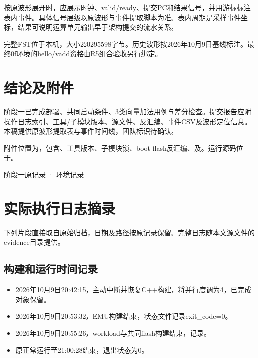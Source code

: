 按原波形展开时，应展示时钟、valid/ready、提交PC和结果信号，并用游标标注表内事件。具体信号层级以原波形与事件提取脚本为准。表内周期是采样事件坐标，结果可说明运算单元输出早于架构提交的流水关系。\par




{\raggedright 完整FST位于本机，大小220295598字节。历史波形按2026年10月9日基线标注。最终0f环境的hello/vadd资格由R5组合验收另行绑定。\par}



\section{结论及附件}


阶段一已完成部署、共同启动条件、3类向量加法用例与差分检查。提交报告应附操作日志索引、工具/子模块版本、源文件、反汇编、事件CSV及波形定位信息。本稿提供原波形提取表与事件时间线，团队标识待确认。\par


附件位置为，包含、工具版本、子模块锁、boot-flash反汇编、及。运行源码位于。\par


\href{https://github.com/cc77-builder/riscv/blob/eca41d7cd959f5f3c4f240e382919c492d1ccb96/team/docs/stage1.md}{阶段一原记录} · \href{https://github.com/cc77-builder/riscv/blob/eca41d7cd959f5f3c4f240e382919c492d1ccb96/team/docs/environment.md}{环境记录}\par
\section{实际执行日志摘录}
下列片段直接取自原始归档，日期及路径按原记录保留。完整日志随本文源文件的evidence目录提供。
\subsection{构建和运行时间记录}
\begin{itemize}
\item 2026年10月9日20:42:15，主动中断并恢复C++构建，将并行度调为4，已完成对象保留。
\item 2026年10月9日20:53:32，EMU构建结束，状态文件记录exit\_code=0。
\item 2026年10月9日20:55:26，workload与共同flash构建结束，记录。
\item 原正常运行至21:00:28结束，退出状态为0。
\end{itemize}
